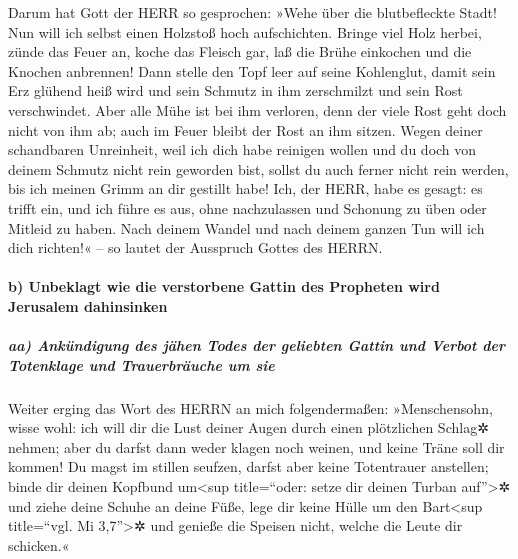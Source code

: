 Darum hat Gott der HERR so gesprochen: »Wehe über die
blutbefleckte Stadt! Nun will ich selbst einen Holzstoß hoch
aufschichten. Bringe viel Holz herbei, zünde das Feuer
an, koche das Fleisch gar, laß die Brühe einkochen und die Knochen
anbrennen! Dann stelle den Topf leer auf seine
Kohlenglut, damit sein Erz glühend heiß wird und sein Schmutz in ihm
zerschmilzt und sein Rost verschwindet. Aber alle Mühe
ist bei ihm verloren, denn der viele Rost geht doch nicht von ihm ab;
auch im Feuer bleibt der Rost an ihm sitzen. Wegen deiner
schandbaren Unreinheit, weil ich dich habe reinigen wollen und du doch
von deinem Schmutz nicht rein geworden bist, sollst du auch ferner nicht
rein werden, bis ich meinen Grimm an dir gestillt habe!
Ich, der HERR, habe es gesagt: es trifft ein, und ich
führe es aus, ohne nachzulassen und Schonung zu üben oder Mitleid zu
haben. Nach deinem Wandel und nach deinem ganzen Tun will ich dich
richten!« -- so lautet der Ausspruch Gottes des HERRN.

\hypertarget{b-unbeklagt-wie-die-verstorbene-gattin-des-propheten-wird-jerusalem-dahinsinken}{%
\paragraph{b) Unbeklagt wie die verstorbene Gattin des Propheten wird
Jerusalem
dahinsinken}\label{b-unbeklagt-wie-die-verstorbene-gattin-des-propheten-wird-jerusalem-dahinsinken}}

\hypertarget{aa-ankuxfcndigung-des-juxe4hen-todes-der-geliebten-gattin-und-verbot-der-totenklage-und-trauerbruxe4uche-um-sie}{%
\subparagraph{aa) Ankündigung des jähen Todes der geliebten Gattin und
Verbot der Totenklage und Trauerbräuche um
sie}\label{aa-ankuxfcndigung-des-juxe4hen-todes-der-geliebten-gattin-und-verbot-der-totenklage-und-trauerbruxe4uche-um-sie}}

Weiter erging das Wort des HERRN an mich folgendermaßen:
»Menschensohn, wisse wohl: ich will dir die Lust deiner
Augen durch einen plötzlichen Schlag✲ nehmen; aber du darfst dann weder
klagen noch weinen, und keine Träne soll dir kommen! Du
magst im stillen seufzen, darfst aber keine Totentrauer anstellen; binde
dir deinen Kopfbund um\textless sup title=``oder: setze dir deinen
Turban auf''\textgreater✲ und ziehe deine Schuhe an deine Füße, lege dir
keine Hülle um den Bart\textless sup title=``vgl. Mi 3,7''\textgreater✲
und genieße die Speisen nicht, welche die Leute dir schicken.«

